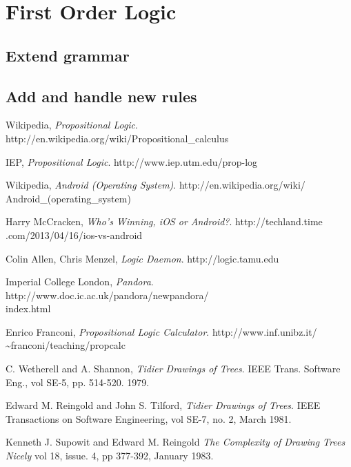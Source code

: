 \documentclass{report}
\begin{document}
\section{First Order Logic}
\subsection{Extend grammar}
\subsection{Add and handle new rules}

\begin{thebibliography}{9}

  Wikipedia,
  \emph{Propositional Logic}.
  http://en.wikipedia.org/wiki/Propositional\_calculus

  IEP,
  \emph{Propositional Logic}.
  http://www.iep.utm.edu/prop-log

  Wikipedia,
  \emph{Android (Operating System)}.
  http://en.wikipedia.org/wiki/\\Android\_(operating\_system)

  Harry McCracken,
  \emph{Who’s Winning, iOS or Android?}.
  http://techland.time\\.com/2013/04/16/ios-vs-android

  Colin Allen, Chris Menzel,
  \emph{Logic Daemon}.
  http://logic.tamu.edu

  Imperial College London,
  \emph{Pandora}.
  http://www.doc.ic.ac.uk/pandora/newpandora/\\index.html

  Enrico Franconi,
  \emph{Propositional Logic Calculator}.
  http://www.inf.unibz.it/\\\textasciitilde franconi/teaching/propcalc

  C. Wetherell and A. Shannon,
  \emph{Tidier Drawings of Trees}.
  IEEE Trans. Software Eng., 
  vol SE-5, pp. 514-520.
  1979.

  Edward M. Reingold and John S. Tilford,
  \emph{Tidier Drawings of Trees}.
  IEEE Transactions on Software Engineering, 
  vol SE-7, no. 2,
  March 1981.

  Kenneth J. Supowit and Edward M. Reingold
  \emph{The Complexity of Drawing Trees Nicely}
  vol 18, issue. 4, pp 377-392,
  January 1983.


\end{thebibliography}
\end{document}
